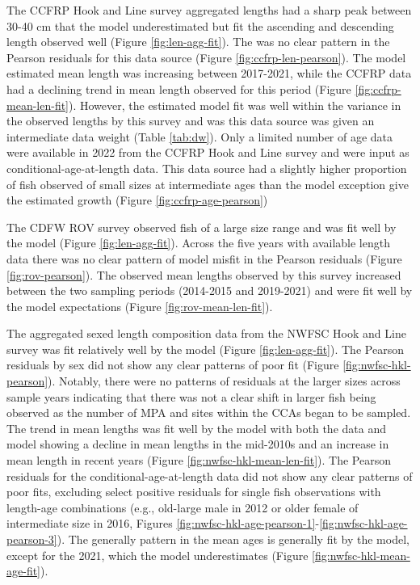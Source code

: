 \documentclass[11pt,
  english,
  letterpaper,
]{article}
\begin{document}
The CCFRP Hook and Line survey aggregated lengths had a sharp peak between 30-40 cm that the model underestimated but fit the ascending and descending length observed well (Figure \ref{fig:len-agg-fit}). The was no clear pattern in the Pearson residuals for this data source (Figure \ref{fig:ccfrp-len-pearson}). The model estimated mean length was increasing between 2017-2021, while the CCFRP data had a declining trend in mean length observed for this period (Figure \ref{fig:ccfrp-mean-len-fit}). However, the estimated model fit was well within the variance in the observed lengths by this survey and was this data source was given an intermediate data weight (Table \ref{tab:dw}). Only a limited number of age data were available in 2022 from the CCFRP Hook and Line survey and were input as conditional-age-at-length data. This data source had a slightly higher proportion of fish observed of small sizes at intermediate ages than the model exception give the estimated growth (Figure \ref{fig:ccfrp-age-pearson})

The CDFW ROV survey observed fish of a large size range and was fit well by the model (Figure \ref{fig:len-agg-fit}). Across the five years with available length data there was no clear pattern of model misfit in the Pearson residuals (Figure \ref{fig:rov-pearson}). The observed mean lengths observed by this survey increased between the two sampling periods (2014-2015 and 2019-2021) and were fit well by the model expectations (Figure \ref{fig:rov-mean-len-fit}).

The aggregated sexed length composition data from the NWFSC Hook and Line survey was fit relatively well by the model (Figure \ref{fig:len-agg-fit}). The Pearson residuals by sex did not show any clear patterns of poor fit (Figure \ref{fig:nwfsc-hkl-pearson}). Notably, there were no patterns of residuals at the larger sizes across sample years indicating that there was not a clear shift in larger fish being observed as the number of MPA and sites within the CCAs began to be sampled. The trend in mean lengths was fit well by the model with both the data and model showing a decline in mean lengths in the mid-2010s and an increase in mean length in recent years (Figure \ref{fig:nwfsc-hkl-mean-len-fit}). The Pearson residuals for the conditional-age-at-length data did not show any clear patterns of poor fits, excluding select positive residuals for single fish observations with length-age combinations (e.g., old-large male in 2012 or older female of intermediate size in 2016, Figures \ref{fig:nwfsc-hkl-age-pearson-1}-\ref{fig:nwfsc-hkl-age-pearson-3}). The generally pattern in the mean ages is generally fit by the model, except for the 2021, which the model underestimates (Figure \ref{fig:nwfsc-hkl-mean-age-fit}).
\end{document}

